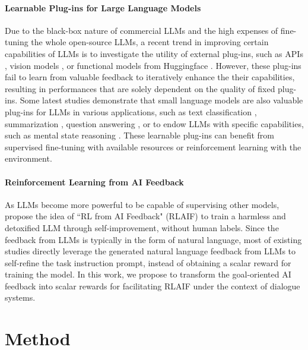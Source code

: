 \documentclass{article} %
\begin{document}
\paragraph{Learnable Plug-ins for Large Language Models}
Due to the black-box nature of commercial LLMs and the high expenses of fine-tuning the whole open-source LLMs, a recent trend in improving certain capabilities of LLMs is to investigate the utility of external plug-ins, such as APIs \citep{toolformer}, vision models \citep{visual-chatgpt}, or functional models from Huggingface \citep{hugginggpt}. 
However, these plug-ins fail to learn from valuable feedback to iteratively enhance the their capabilities, resulting in performances that are solely dependent on the quality of fixed plug-ins. 
Some latest studies demonstrate that small language models are also valuable plug-ins for LLMs in various applications, such as text classification \citep{small-plugin},  summarization \citep{dsp}, question answering \citep{yao2023retroformer}, or to endow LLMs with specific capabilities, such as mental state reasoning \citep{acl23-tom-plug}. 
These learnable plug-ins can benefit from supervised fine-tuning with available resources or reinforcement learning with the environment. 



\paragraph{Reinforcement Learning from AI Feedback}
As LLMs become more powerful to be capable of supervising other models, \citet{constitutionalai} propose the idea of ``RL from AI Feedback" (RLAIF) to train a harmless and detoxified LLM through self-improvement, without human labels. 
Since the feedback from LLMs is typically in the form of natural language, most of existing studies \citep{reflexion,negotiate-selfplay,self-refine,rap} directly leverage the generated natural language feedback from LLMs to self-refine the task instruction prompt, instead of obtaining a scalar reward for training the model. 
In this work, we propose to transform the goal-oriented AI feedback into scalar rewards for facilitating RLAIF under the context of dialogue systems. 


\section{Method}\label{sec:method}
\end{document}
